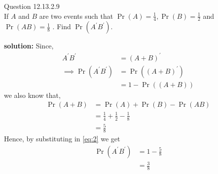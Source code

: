 \documentclass{article}
\begin{document}
\providecommand{\pr}[1]{\ensuremath{\Pr\left(#1\right)}}
\providecommand{\brak}[1]{\ensuremath{\left(#1\right)}}
\newcommand{\solution}{\noindent \textbf{solution: }}

Question 12.13.2.9\\
If $A$ and $B$ are two events such that $\pr{A} = \frac{1}{4}, \pr{B} = \frac{1}{2}$ and $\pr{AB} = \frac{1}{8}$ . Find $\pr{A^{\prime}B^{\prime}}.$

\solution
Since,
\begin{align}
	A^{\prime}B^{\prime} &= \brak{A+B}^{\prime} \\ \label{eq:2}
	\implies \pr{A^{\prime}B^{\prime}} &= \pr{\brak{A+B}^{\prime}} \\
	&= 1-\pr{\brak{A+B}}
\end{align}
we also know that,
\begin{align}
	\pr{A+B} &= \pr{A} + \pr{B} - \pr{AB} \\
	&= \frac{1}{4} +\frac{1}{2} - \frac{1}{8} \\
	&= \frac{5}{8}
\end{align}
Hence, by substituting in \eqref{eq:2} we get
\begin{align}
	\pr{A^{\prime}B^{\prime}} &= 1 - \frac{5}{8} \\
	&= \frac{3}{8}
\end{align}
\end{document}
